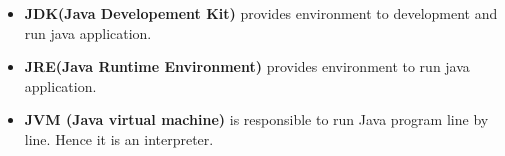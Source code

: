 \setlength{\columnsep}{3pt}
\begin{flushleft}
	
	\begin{itemize}
		\item \textbf{JDK(Java Developement Kit)} provides environment to development and run java application.
		\item \textbf{JRE(Java Runtime Environment)} provides environment to run java application.
		\item \textbf{JVM (Java virtual machine)} is responsible to run Java program line by line. Hence it is an interpreter.
		
	\end{itemize}
	
	
	
\end{flushleft}

\newpage


